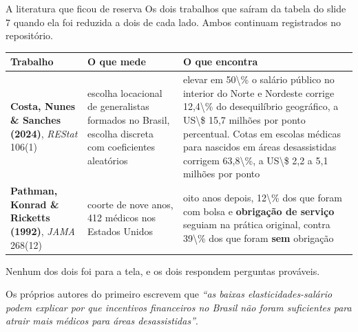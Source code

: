 \documentclass[aspectratio=169,10pt]{beamer}
\begin{document}
\begin{frame}{A literatura que ficou de reserva}
  \vspace{0.1em}
  {\footnotesize Os dois trabalhos que saíram da tabela do slide 7 quando ela
  foi reduzida a dois de cada lado. Ambos continuam registrados no
  repositório.}

  \vspace{0.3em}
  {\scriptsize\renewcommand{\arraystretch}{1.2}
  \begin{tabularx}{\textwidth}{@{}>{\raggedright\arraybackslash}p{} >{\raggedright\arraybackslash}p{} L@{}}
    \toprule
    \bfseries Trabalho & \bfseries O que mede & \bfseries O que encontra \\
    \midrule
    \textbf{Costa, Nunes \& Sanches (2024)}, \textit{REStat} 106(1) &
      escolha locacional de generalistas formados no Brasil, escolha discreta
      com coeficientes aleatórios &
      elevar em \num{50\%} o salário público no interior do Norte e Nordeste
      corrige \num{12,4\%} do desequilíbrio geográfico, a \num{US\$ 15,7
      milhões} por ponto percentual. Cotas em escolas médicas para nascidos em
      áreas desassistidas corrigem \num{63,8\%}, a \num{US\$ 2,2 a 5,1
      milhões} por ponto \\
    \addlinespace[0.3em]
    \textbf{Pathman, Konrad \& Ricketts (1992)}, \textit{JAMA} 268(12) &
      coorte de nove anos, 412 médicos nos Estados Unidos &
      oito anos depois, \num{12\%} dos que foram com bolsa e \textbf{obrigação
      de serviço} seguiam na prática original, contra \num{39\%} dos que foram
      \textbf{sem} obrigação \\
    \bottomrule
  \end{tabularx}}

  \vspace{0.6em}
  {\small {}
  Nenhum dos dois foi para a tela, e os dois respondem perguntas prováveis.}

  \vspace{0.6em}
  {\footnotesize Os próprios autores do primeiro escrevem que \textit{``as
  baixas elasticidades-salário podem explicar por que incentivos financeiros
  no Brasil não foram suficientes para atrair mais médicos para áreas
  desassistidas''}.}

\end{frame}
\end{document}
